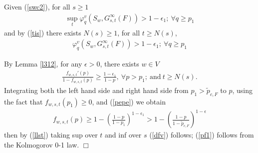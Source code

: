 \documentclass[11pt]{amsart}
\theoremstyle{plain}
\numberwithin{equation}{section}
\numberwithin{figure}{section}
\begin{document}
Given (\ref{swc2}), for all $s\geq 1$ 
\begin{align*}
\sup_t\varphi_q^v(S_w,G_{s,t}^{\infty}(F))>1-\epsilon_1;\ \forall q\geq p_1
\end{align*}
and by (\ref{tis}) there exists $N(s)\geq 1$,  for all $t\geq N(s)$,
\begin{align*}
\varphi_q^v(S_w,G_{s,t}^{\infty}(F))>1-\epsilon_1;\ \forall q\geq p_1
\end{align*}



By Lemma \ref{l312}, for any $\epsilon>0$, there exists $w\in V$
\begin{align*}
    \frac{f_{w,s,t}'(p)}{1-f_{w,s,t}(p)}\geq \frac{1-\epsilon_1}{1-p},\ \forall p>p_1;\ \mathrm{and}\ t\geq N(s).
\end{align*}
Integrating both the left hand side and right hand side from $p_1>\tilde{p}_{c,F}$ to $p$, using the fact that $f_{w,s,t}\left(p_1\right)\geq 0$, and (\ref{pepe}) we obtain 
\begin{align*}
f_{w,s,t}(p)\geq 1-\left(\frac{1-p}{1-p_1}\right)^{1-\epsilon_1}>1-\left(\frac{1-p}{1-\tilde{p}_{c,F}}\right)^{1-\epsilon}
\end{align*}
then by (\ref{llst}) taking sup over $t$ and inf over $s$ (\ref{dfv}) follows; (\ref{pf1}) follows from the Kolmogorov 0-1 law.
\hfill$\Box$
\end{document}
